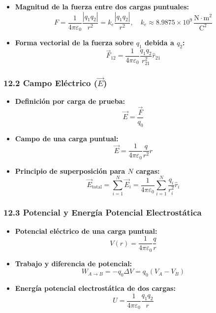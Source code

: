 \documentclass[11pt,a4paper]{article}
\begin{document}
\begin{itemize}
  \item \textbf{Magnitud de la fuerza entre dos cargas puntuales:}
  \[
    F = \frac{1}{4\pi\varepsilon_0} \frac{|q_1 q_2|}{r^2} = k_e \frac{|q_1 q_2|}{r^2}, \quad k_e \approx 8.9875 \times 10^9 \, \frac{\text{N}\cdot\text{m}^2}{\text{C}^2}
  \]
  \item \textbf{Forma vectorial de la fuerza sobre $q_1$ debida a $q_2$:}
  \[
    \vec{F}_{12} = \frac{1}{4\pi\varepsilon_0} \frac{q_1 q_2}{r_{21}^2} \hat{r}_{21}
  \]
\end{itemize}

\subsubsection*{12.2 Campo Eléctrico ($\vec{E}$)}

\begin{itemize}
  \item \textbf{Definición por carga de prueba:}
  \[
    \vec{E} = \frac{\vec{F}}{q_0}
  \]
  \item \textbf{Campo de una carga puntual:}
  \[
    \vec{E} = \frac{1}{4\pi\varepsilon_0} \frac{q}{r^2} \hat{r}
  \]
  \item \textbf{Principio de superposición para $N$ cargas:}
  \[
    \vec{E}_{\text{total}} = \sum_{i=1}^N \vec{E}_i = \frac{1}{4\pi\varepsilon_0} \sum_{i=1}^N \frac{q_i}{r_i^2} \hat{r}_i
  \]
\end{itemize}

\subsubsection*{12.3 Potencial y Energía Potencial Electrostática}

\begin{itemize}
  \item \textbf{Potencial eléctrico de una carga puntual:}
  \[
    V(r) = \frac{1}{4\pi\varepsilon_0} \frac{q}{r}
  \]
  \item \textbf{Trabajo y diferencia de potencial:}
  \[
    W_{A \to B} = -q_0 \Delta V = q_0 (V_A - V_B)
  \]
  \item \textbf{Energía potencial electrostática de dos cargas:}
  \[
    U = \frac{1}{4\pi\varepsilon_0} \frac{q_1 q_2}{r}
  \]
\end{itemize}
\end{document}
